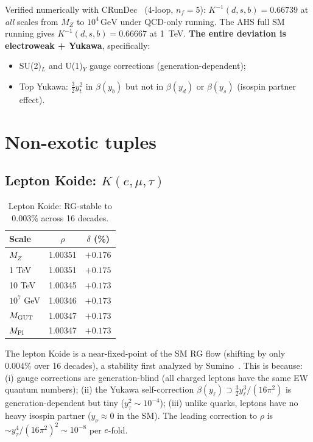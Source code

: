 \documentclass[11pt,a4paper]{article}
\newcommand{\GeV}{\,\text{GeV}}
\newcommand{\MZ}{M_Z}
\newcommand{\MPl}{M_{\rm Pl}}
\newcommand{\MGUT}{M_{\rm GUT}}
\begin{document}
Verified numerically with CRunDec~\cite{CRunDec} (4-loop, $n_f = 5$):
$K^{-1}(d,s,b) = 0.66739$ at \emph{all} scales from $\MZ$ to
$10^4\GeV$ under QCD-only running. The AHS full SM running gives
$K^{-1}(d,s,b) = 0.66667$ at 1~TeV. \textbf{The entire deviation is
electroweak + Yukawa}, specifically:
\begin{itemize}
\item SU(2)$_L$ and U(1)$_Y$ gauge corrections (generation-dependent);
\item Top Yukawa: $\tfrac{3}{2}y_t^2$ in $\beta(y_b)$ but not in
  $\beta(y_d)$ or $\beta(y_s)$ (isospin partner effect).
\end{itemize}

\section{Non-exotic tuples}
\label{sec:nonexotic}

\subsection{Lepton Koide: $K(e,\mu,\tau)$}

\begin{table}[h]
\centering
\begin{tabular}{lcc}
\toprule
Scale & $\rho$ & $\delta$ (\%) \\
\midrule
$\MZ$          & 1.00351 & $+0.176$ \\
1 TeV          & 1.00351 & $+0.175$ \\
10 TeV         & 1.00345 & $+0.173$ \\
$10^7$ GeV     & 1.00346 & $+0.173$ \\
$\MGUT$        & 1.00347 & $+0.173$ \\
$\MPl$         & 1.00347 & $+0.173$ \\
\bottomrule
\end{tabular}
\caption{Lepton Koide: RG-stable to 0.003\% across 16 decades.}
\label{tab:lepton}
\end{table}

The lepton Koide is a near-fixed-point of the SM RG flow (shifting by
only 0.004\% over 16 decades), a stability first analyzed by
Sumino~\cite{Koide:2016}. This is because: (i) gauge corrections
are generation-blind (all charged leptons have the same EW quantum
numbers); (ii) the Yukawa self-correction $\beta(y_\ell) \supset
\tfrac{3}{2}y_\ell^3/(16\pi^2)$ is generation-dependent but tiny
($y_\tau^2 \sim 10^{-4}$); (iii) unlike quarks, leptons have no heavy
isospin partner ($y_\nu \approx 0$ in the SM). The leading correction
to $\rho$ is $\sim y_\tau^4/(16\pi^2)^2 \sim 10^{-8}$ per $e$-fold.
\end{document}
